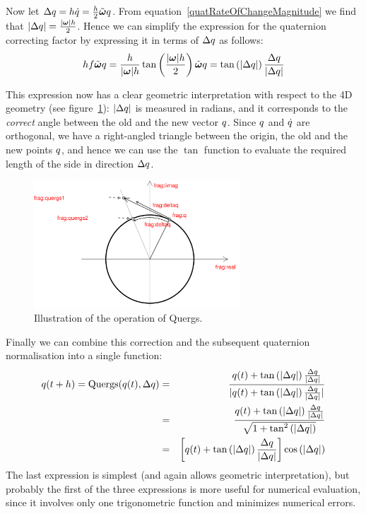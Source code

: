 Now let $\Delta \q{q} = h \dot{\q{q}} =
    \frac{h}{2} \tilde{\ve{\omega}} \q{q}$.
From equation~\ref{quatRateOfChangeMagnitude} we find that
$\norm{\Delta\q{q}} = \frac{\norm{\ve{\omega}} h}{2}$.
Hence we can simplify the expression for the quaternion correcting factor by expressing it
in terms of $\Delta q$ as follows:
$$
h f \tilde{\ve{\omega}}\q{q} = \frac{h}{\norm{\ve{\omega}} h}
    \tan\left(\frac{\norm{\ve{\omega}} h}{2}\right) \tilde{\ve{\omega}} \q{q} =
    \tan\left(\norm{\Delta\q{q}}\right) \frac{\Delta\q{q}}{\norm{\Delta\q{q}}}
$$

This expression now has a clear geometric interpretation with respect to the 4D geometry
(see figure~\ref{quatIntFig2}):
$|\Delta q|$ is measured in radians, and it corresponds to the \emph{correct}
angle between the old and the new vector $q$. Since $q$ and
$\dot{q}$ are orthogonal, we have a right-angled triangle between the origin,
the old and the new points $q$, and hence we can use the $\tan$ function to
evaluate the required length of the side in direction $\Delta q$.

\begin{figure}
\centerline{\includegraphics[width=7.7cm]{figures/quaternion3}}
\caption{Illustration of the operation of Quergs.\label{quatIntFig2}}
\end{figure}

Finally we can combine this correction and the subsequent quaternion normalisation into
a single function:
\begin{eqnarray*}
q(t+h) = \mathrm{Quergs}(q(t), \Delta q) &=&
    \frac{q(t) + \tan\left(|\Delta q|\right)
        \frac{\Delta q}{|\Delta q|}}{
    |q(t) + \tan\left(|\Delta q|\right)
        \frac{\Delta q}{|\Delta q|}|} \\
&=& \frac{q(t) + \tan\left(|\Delta q|\right)
        \frac{\Delta q}{|\Delta q|}}{
    \sqrt{1 + \tan^2\left(|\Delta q|\right)}} \\
&=& \left[q(t) + \tan\left(|\Delta q|\right)
        \frac{\Delta q}{|\Delta q|}\right]
    \cos\left(|\Delta q|\right)
\end{eqnarray*}
The last expression is simplest (and again allows geometric interpretation), but probably
the first of the three expressions is more useful for numerical evaluation, since it involves
only one trigonometric function and minimizes numerical errors.

